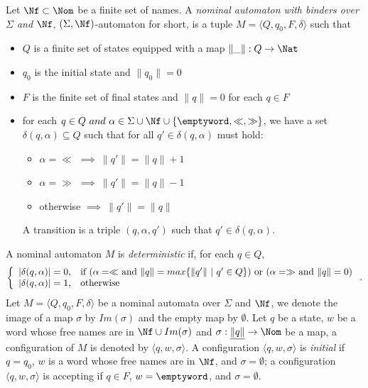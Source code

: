 \begin{definition}\label{def:NA}
  Let $\Nf \subset \Nom$ be a finite set of names. A
  \emph{nominal automaton with binders over $\Sigma$ and $\Nf$},
  $(\Sigma, \Nf)$-automaton for short, is a tuple
  $M=\langle Q,q_0,F,\delta\rangle$ such that
  \begin{itemize}
  \item $Q$ is a finite set of states equipped with a map $\|\_\|: Q\rightarrow \Nat$
  \item $q_0$ is the initial state and $\|q_0\|=0$
  \item $F$ is the finite set of final states and $\|q\|=0$ for each $q\in F$
  \item for each $q\in Q\ and\ \alpha\in \Sigma\cup\Nf \cup{\{\emptyword,\ll,\gg\}}$, we have a set $\delta(q, \alpha)\subseteq Q$ such that for all $q'\in \delta(q, \alpha)$ must hold:
      \begin{itemize}
      \item $ \alpha =\ll$ $\implies \ \|q'\|=\|q\|+1$
      \item $ \alpha=\gg$ $\implies \ \|q'\|=\|q\|-1$
      \item otherwise $\implies \ \|q'\|=\|q\|$
      \end{itemize}
      A transition is a triple $(q, \alpha,q')$ such that $q'\in \delta(q, \alpha)$.
  \end{itemize}
\end{definition}
A nominal automaton $M$ is \emph{deterministic} if, for each $q\in Q$,
\[
  \left\{ \begin{array}{ll}
            \textrm{$| \delta(q, \alpha)| =0$,} & \textrm{if ($ \alpha =\ll$ and $\|q\|=max\{\|q'\|\ |\ q'\in Q\}$) or ($ \alpha =\gg$ and $\|q\|=0$)}\\
            \textrm{$| \delta(q, \alpha)| =1$,} & \textrm{otherwise}
          \end{array} \right..
\]
Let $M=\langle Q,q_0,F,\delta\rangle$ be a nominal automata over
$\Sigma$ and $\Nf$, we denote the image of a map $\sigma$ by
$Im(\sigma)$ and the empty map by $\emptyset$. Let $q$ be a state, $w$
be a word whose free names are in $\Nf\cup Im(\sigma)$ and
$\sigma:\underline{\|q\|}\rightarrow \Nom$ be a map, a
configuration of $M$ is denoted by $\langle q,w,\sigma\rangle$. A
configuration $\langle q,w,\sigma\rangle$ is \textit{initial} if
$q=q_0$, $w$ is a word whose free names are in $\Nf$, and
$\sigma=\emptyset$; a configuration $\langle q,w,\sigma\rangle$ is
accepting if $q\in F$, $w=\emptyword$, and $\sigma=\emptyset$.
